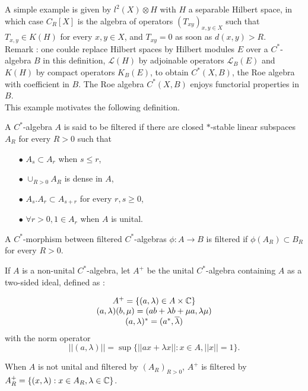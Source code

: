 A simple example is given by $l^2(X)\otimes H$ with $H$ a separable Hilbert space, in which case $C_R[X]$ is the algebra of operators $(T_{xy})_{x,y\in X}$ such that $T_{x,y}\in K(H)$ for every $x,y\in X$, and $T_{xy}=0$ as soon as $d(x,y)>R$.\\
Remark : one coulde replace Hilbert spaces by Hilbert modules $E$ over a $C^*$-algebra $B$ in this definition, $\mathcal L(H)$ by adjoinable operators $\mathcal L_B(E)$ and $K(H)$ by compact operators $K_B(E)$, to obtain $C^*(X,B)$, the Roe algebra with coefficient in $B$. The Roe algebra $C^*(X,B)$ enjoys functorial properties in $B$.\\

This example motivates the following definition.\\

\begin{definition}
A $C^*$-algebra $A$ is said to be filtered if there are closed $*$-stable linear subspaces $A_R$ for every $R>0$ such that
\begin{itemize}
\item[$\bullet$] $A_s \subset A_r$ when $s\leq r$,
\item[$\bullet$] $\cup_{R>0} A_R$ is dense in $A$,
\item[$\bullet$] $A_s . A_r \subset A_{s+r}$ for every $r,s \geq 0$,
\item[$\bullet$] $\forall r>0, 1\in A_r$ when $A$ is unital.\\
\end{itemize}

A $C^*$-morphism between filtered $C^*$-algebras $\phi : A \rightarrow B$ is filtered if $\phi(A_R)\subset B_R$ for every $R>0$.
\end{definition}

If $A$ is a non-unital $C^*$-algebra, let $A^+$ be the unital $C^*$-algebra containing $A$ as a two-sided ideal, defined as :

\[\begin{array}{c}A^+=\{(a,\lambda)\in A\times \mathbb C \} \\ (a,\lambda)(b,\mu)=(ab+\lambda b +\mu a,\lambda\mu) \\ (a,\lambda)^*=(a^*,\overline\lambda)\end{array}\]
with the norm operator
\[||(a,\lambda)||=\sup \{||ax+\lambda x|| : x\in A , ||x||=1\}.\]

When $A$ is not unital and filtered by $(A_R)_{R>0}$, $A^+$ is filtered by $A_R^+= \{(x,\lambda) : x\in A_R,\lambda\in \mathbb C\}$.


